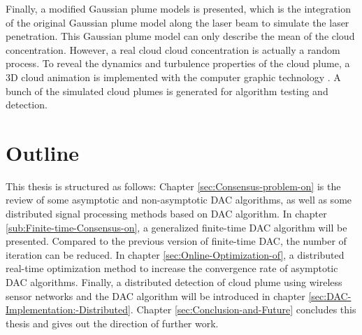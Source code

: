 Finally, a modified Gaussian plume models is presented, which is the
integration of the original Gaussian plume model along the laser beam
to simulate the laser penetration. This Gaussian plume model can only
describe the mean of the cloud concentration. However, a real cloud
cloud concentration is actually a random process. To reveal  the dynamics
and turbulence properties of the cloud plume, a 3D cloud animation
is implemented with the computer graphic technology \cite{He2011}. A
bunch of the simulated cloud plumes is generated for algorithm testing
and detection.




\section{Outline}

This thesis is structured as follows: Chapter  \ref{sec:Consensus-problem-on}
is the review of some asymptotic and non-asymptotic DAC algorithms,
as well as some distributed signal processing methods based on DAC
algorithm. In chapter  \ref{sub:Finite-time-Consensus-on}, a generalized
finite-time DAC algorithm will be presented. Compared to the previous
version of finite-time DAC, the number of iteration can be reduced.
In chapter \ref{sec:Online-Optimization-of}, a distributed real-time
optimization method to increase the convergence rate of asymptotic
DAC algorithms. Finally, a distributed detection of cloud plume using
wireless sensor networks and the DAC algorithm will be introduced
in chapter \ref{sec:DAC-Implementation:-Distributed}. Chapter \ref{sec:Conclusion-and-Future}
concludes this thesis and gives out the direction of further work.
